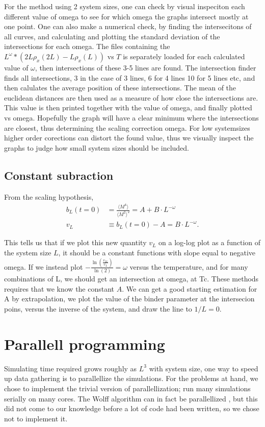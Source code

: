 For the method using 2 system sizes, one can check by visual inspeciton each different value of omega to see for which omega the graphs intersect mostly at one point. One can also make a numerical check, by finding the intersecitons of all curves, and calculating  and plotting the standard deviation of the intersections for each omega.
The files containing the $L^{\omega}*(2L\rho_x(2L) - L\rho_x(L))$ vs $T$ is separately loaded for each calculated value of $\omega$, then intersections of these 3-5 lines are found. 
The intersection finder finds all intersections, 3 in the case of 3 lines, 6 for 4 lines 10 for 5 lines etc, and then calulates the average position of these intersections. The mean of the euclidean distances are then used as a measure of how close the intersections are. This value is then printed together with the value of omega, and finally plotted vs omega.
Hopefully the graph will have a clear minimum where the intersections are closest, thus determining the scaling correction omega.
For low systemsizes higher order corections can distort the found value, thus we visually inspect the graphs to judge how small system sizes should be included. 
\subsection{Constant subraction}
From the scaling hypothesis, 
\begin{align}
  b_L(t=0) &= \frac{\langle M^4 \rangle}{\langle M^2\rangle^2} = A + B\cdot L^{-\omega}\\
  v_L &\equiv b_L(t=0) -A = B\cdot L^{-\omega}.
\end{align}

This tells us that if we plot this new quantity $v_L$ on a log-log plot as a function of the system size $L$, it should be a constant functions with slope equal to negative omega.
If we instead plot $-\frac{\ln\left(\frac{v_{2L}}{v_L}\right)}{\ln(2)} = \omega$ versus the temperature, and for many combinations of L, we should get an intersection at omega, at Tc.
These methods requires that we know the constant $A$.
We can get a good starting estimation for A by extrapolation,
we plot the value of the binder parameter at the intersecion poins, versus the inverse of the system, and draw the line to $1/L = 0$.

\section{Parallell programming}
Simulating time required grows roughly as $L^3$ with system size, one way to speed up data gathering is to parallellize the simulations.
For the problems at hand, we chose to implement the trivial version of parallellization; run many simulations serially on many cores.
The Wolff algorithm can in fact be parallellized \cite{Kaupuzs2010}, but this did not come to our knowledge before a lot of code had been written, so we chose not to implement it. 

